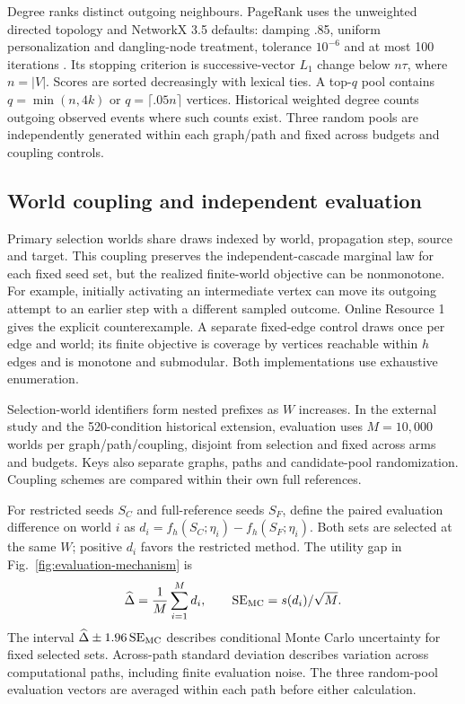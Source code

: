 \documentclass[smallextended]{svjour3}
\begin{document}
Degree ranks distinct outgoing neighbours. PageRank uses the unweighted directed topology and NetworkX 3.5 defaults: damping .85, uniform personalization and dangling-node treatment, tolerance $10^{-6}$ and at most 100 iterations \cite{networkxpr}. Its stopping criterion is successive-vector $L_1$ change below $n\tau$, where $n=|V|$. Scores are sorted decreasingly with lexical ties. A top-$q$ pool contains $q=\min(n,4k)$ or $q=\lceil .05n\rceil$ vertices. Historical weighted degree counts outgoing observed events where such counts exist. Three random pools are independently generated within each graph/path and fixed across budgets and coupling controls.

\subsection{World coupling and independent evaluation}\label{sec:coupling}
Primary selection worlds share draws indexed by world, propagation step, source and target. This coupling preserves the independent-cascade marginal law for each fixed seed set, but the realized finite-world objective can be nonmonotone. For example, initially activating an intermediate vertex can move its outgoing attempt to an earlier step with a different sampled outcome. Online Resource 1 gives the explicit counterexample. A separate fixed-edge control draws once per edge and world; its finite objective is coverage by vertices reachable within $h$ edges and is monotone and submodular. Both implementations use exhaustive enumeration.

Selection-world identifiers form nested prefixes as $W$ increases. In the external study and the 520-condition historical extension, evaluation uses $M=10,000$ worlds per graph/path/coupling, disjoint from selection and fixed across arms and budgets. Keys also separate graphs, paths and candidate-pool randomization. Coupling schemes are compared within their own full references.

For restricted seeds $S_C$ and full-reference seeds $S_F$, define the paired evaluation difference on world $i$ as $d_i=f_h(S_C;\eta_i)-f_h(S_F;\eta_i)$. Both sets are selected at the same $W$; positive $d_i$ favors the restricted method. The utility gap in Fig.~\ref{fig:evaluation-mechanism} is
\begin{equation}
\widehat\Delta=\frac{1}{M}\sum_{i=1}^{M}d_i,
\qquad \operatorname{SE}_{\rm MC}=s(d_i)/\sqrt M.
\end{equation}
The interval $\widehat\Delta\pm1.96\operatorname{SE}_{\rm MC}$ describes conditional Monte Carlo uncertainty for fixed selected sets. Across-path standard deviation describes variation across computational paths, including finite evaluation noise. The three random-pool evaluation vectors are averaged within each path before either calculation.
\end{document}
